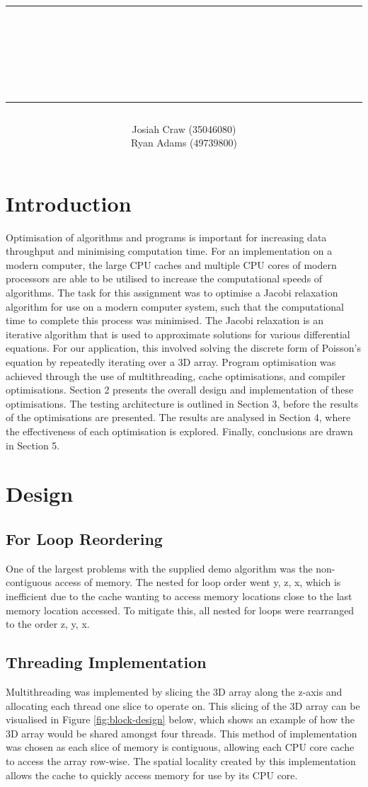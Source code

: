 \documentclass[12pt]{article}
\author{\LARGE Josiah Craw (35046080)\vspace{1cm}\\\LARGE Ryan Adams (49739800)\vspace{1cm}\\}
\title{\rule{\textwidth}{0.8pt} \\ {\huge \textbf{\reportTitle}}\\{\large \subTitle} \rule{\textwidth}{0.8pt}}
\begin{document}
\maketitle
\thispagestyle{empty}
\newpage

\setcounter{page}{1}
\section{Introduction}
Optimisation of algorithms and programs is important for increasing data throughput and
minimising computation time. For an implementation on a modern computer, the large CPU caches and multiple CPU cores
of modern processors are able to be utilised to increase the computational speeds of algorithms. The task for this
assignment was to optimise a Jacobi relaxation algorithm for use on a modern computer system, such that the
computational time to complete this process was minimised. The Jacobi relaxation is an iterative algorithm that 
is used to approximate solutions for various differential equations. For our application, this involved solving the 
discrete form of Poisson’s equation by repeatedly iterating over a 3D array. Program optimisation was achieved through 
the use of multithreading, cache optimisations, and compiler optimisations. Section 2 presents the overall design and 
implementation of these optimisations. The testing architecture is outlined in Section 3, before the results of the 
optimisations are presented. The results are analysed in Section 4, where the effectiveness of each optimisation is 
explored. Finally, conclusions are drawn in Section 5.

\section{Design}

\subsection{For Loop Reordering}
One of the largest problems with the supplied demo algorithm was the non-contiguous access of memory. The nested for
loop order went y, z, x, which is inefficient due to the cache wanting to access memory locations close to
the last memory location accessed. To mitigate this, all nested for loops were rearranged to the order z, y, x.

\subsection{Threading Implementation}
Multithreading was implemented by slicing the 3D array along the z-axis and allocating each thread one slice to operate on.
This slicing of the 3D array can be visualised in Figure \ref{fig:block-design} below, which shows an example of how the 3D array
would be shared amongst four threads. This method of implementation was chosen as each slice of memory is contiguous,
allowing each CPU core cache to access the array row-wise. The spatial locality created by this implementation allows
the cache to quickly access memory for use by its CPU core.
\end{document}
